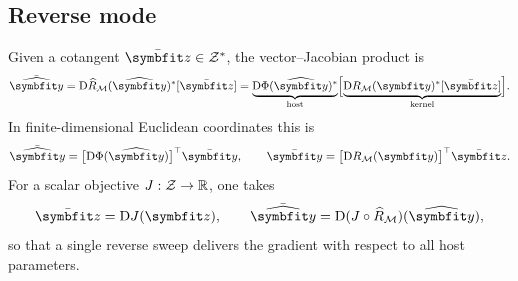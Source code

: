 \subsection{Reverse mode}
\label{sec:vjp}

Given a cotangent \(\bar{\bm z}\in \ResponseSpace^*\), the vector--Jacobian product is
\begin{equation}
\label{eq:vjp-composed}
\bar{\HostParameters}
=
\D \ComposedResponse_{\ModelFamily}(\HostParameters)^*[\bar{\bm z}]
=
\underbrace{\D \ParameterMap(\HostParameters)^*}_{\text{host}}
\Bigl[
\underbrace{\D \ResponseMap_{\ModelFamily}(\CoreParameters)^*[\bar{\bm z}]}_{\text{kernel}}
\Bigr].
\end{equation}
In finite-dimensional Euclidean coordinates this is
\begin{equation}
\label{eq:vjp-euclidean}
\bar{\HostParameters}
=
\bigl[\D \ParameterMap(\HostParameters)\bigr]^{\top}\bar{\CoreParameters},
\qquad
\bar{\CoreParameters}
=
\bigl[\D \ResponseMap_{\ModelFamily}(\CoreParameters)\bigr]^{\top}\bar{\bm z}.
\end{equation}
For a scalar objective \(J:\mathcal Z\to\mathbb R\), one takes
\[
\bar{\bm z}
=
\D \Objective(\bm z),
\qquad
\bar{\HostParameters}
=
\D (\Objective\circ\ComposedResponse_{\ModelFamily})(\HostParameters),
\]
so that a single reverse sweep delivers the gradient with respect to all host parameters.

